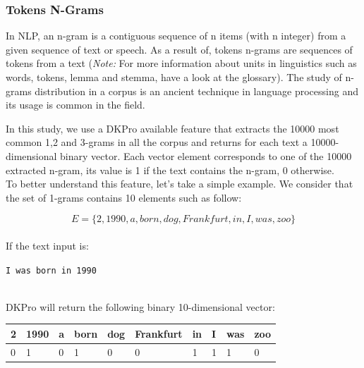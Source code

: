 \subsubsection{Tokens N-Grams}
In NLP, an n-gram is a contiguous sequence of n items (with n integer) from a given sequence of text or speech. As a result of, tokens n-grams are sequences of tokens from a text (\textit{Note: } For more information about units in linguistics such as words, tokens, \gls{lemma} and stemma, have a look at the glossary). The study of n-grams distribution in a corpus is an ancient technique \cite{tcjullmann77} in language processing and its usage is common in the field.

In this study, we use a DKPro available feature that extracts the 10000 most common 1,2 and 3-grams in all the corpus and returns for each text a 10000-dimensional binary vector. Each vector element corresponds to one of the 10000 extracted n-gram, its value is 1 if the text contains the n-gram, 0 otherwise.
\\
To better understand this feature, let's take a simple example. We consider that the set of 1-grams contains 10 elements such as follow: 

\begin{equation*}
E = \{2, 1990, a, born, dog, Frankfurt, in, I, was, zoo\}
\end{equation*}
\\

If the text input is:
\\
\centerline{\texttt{I was born in 1990}}
\\

DKPro will return the following binary 10-dimensional vector:
\begin{table}[h]
\center
\begin{tabular}{llllllllll}
2                       & 1990                   & a                      & born                   & dog                    & Frankfurt              & in                     & I                      & was                    & zoo                    \\ \hline
\multicolumn{1}{|l|}{0} & \multicolumn{1}{l|}{1} & \multicolumn{1}{l|}{0} & \multicolumn{1}{l|}{1} & \multicolumn{1}{l|}{0} & \multicolumn{1}{l|}{0} & \multicolumn{1}{l|}{1} & \multicolumn{1}{l|}{1} & \multicolumn{1}{l|}{1} & \multicolumn{1}{l|}{0} \\ \hline
\end{tabular}
\end{table}

